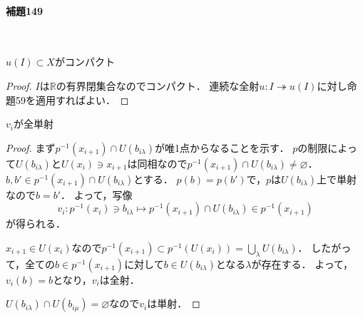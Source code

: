 \documentclass[a4paper, leqno]{ltjsreport}
\begin{document}
\paragraph{補題149}~
\begin{screen}
  $u(I) \subset X$がコンパクト
\end{screen}
\begin{proof}
  $I$は$\mathbb{R}$の有界閉集合なのでコンパクト．
  連続な全射$u\colon I \twoheadrightarrow u(I)$に対し命題59を適用すればよい．
\end{proof}

\begin{screen}
  $v_i$が全単射
\end{screen}
\begin{proof}
  まず$p^{-1}(x_{i+1}) \cap U(b_{i\lambda})$が唯1点からなることを示す．
  $p$の制限によって$U(b_{i\lambda})$と$U(x_i) \ni x_{i+1}$は同相なので$p^{-1}(x_{i+1}) \cap U(b_{i\lambda}) \neq \varnothing$．
  $b, b' \in p^{-1}(x_{i+1}) \cap U(b_{i\lambda})$とする．
  $p(b) = p(b')$で，$p$は$U(b_{i\lambda})$上で単射なので$b=b'$．
  よって，写像
  \[
    v_i\colon p^{-1}(x_i) \ni b_{i\lambda} \mapsto p^{-1}(x_{i+1}) \cap U(b_{i\lambda}) \in p^{-1}(x_{i+1})
  \]
  が得られる．

  $x_{i+1} \in U(x_i)$なので$p^{-1}(x_{i+1}) \subset p^{-1}(U(x_i)) = \bigcup_{\lambda} U(b_{i\lambda})$．
  したがって，全ての$b\in p^{-1}(x_{i+1})$に対して$b \in U(b_{i\lambda})$となる$\lambda$が存在する．
  よって，$v_i(b) = b$となり，$v_i$は全射．

  $U(b_{i\lambda}) \cap U(b_{i\mu}) = \varnothing$なので$v_i$は単射．
\end{proof}
\end{document}
